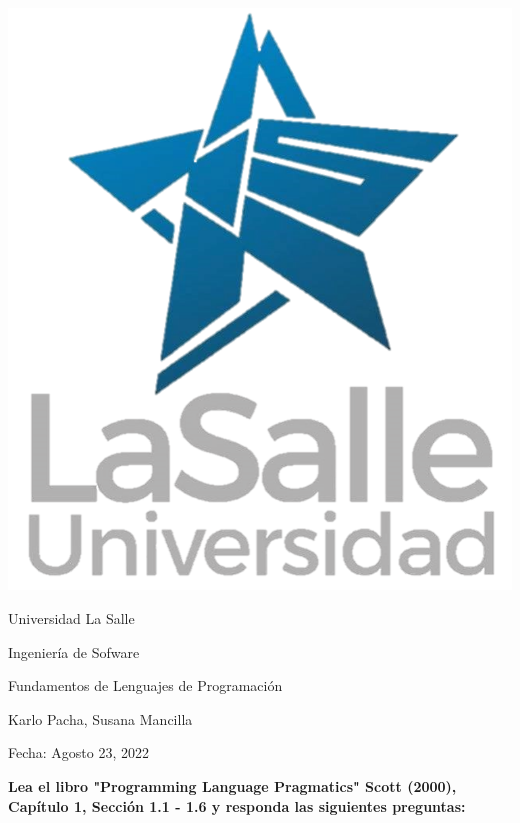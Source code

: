 \documentclass[12pt, a4paper]{exam}
\begin{document}
	\noindent
	\begin{minipage}[l]{0.1\textwidth}
		\noindent
		\includegraphics[width=2.4\textwidth]{logo.png}
	\end{minipage}
\hfill
\begin{minipage}[c]{0.8\textwidth}
	\begin{center}
		{\large Universidad La Salle \par
		\small	Ingeniería de Sofware	\par
		\large	Fundamentos de Lenguajes de Programación	\par
\small Karlo Pacha, Susana Mancilla  \par
\small Fecha: Agosto 23, 2022} \par
	\end{center}
\end{minipage}
\par
\vspace{0.2in}
\noindent
\par 
\vspace{0.15in}
\noindent
\centering
{\small \bfseries 	Lea el libro "Programming Language Pragmatics" Scott (2000), Capítulo 1, Sección 1.1 - 1.6
y responda las siguientes preguntas: }
\end{document}
